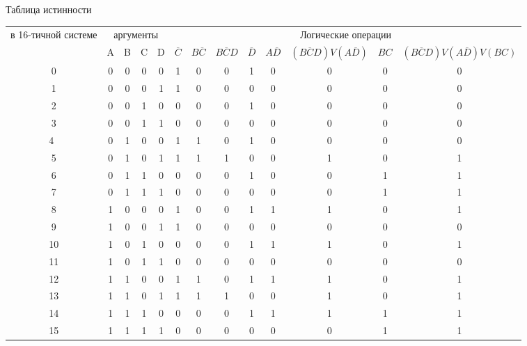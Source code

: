\documentclass{article}
\begin{document}
\begin{landscape}
\centering Таблица истинности

\begin{table}[ht]
\begin{tabular}{ |c|c|c|c|c|c|c|c|c|c|c|c|c| }
\toprule
\multirow{2}{*}{в 16-тичной системе} &\multicolumn{4}{|c|}{аргументы}& 
\multicolumn{8}{|c|}{Логические операции}\\
\cmidrule{2-13}&
\multicolumn{1}{|c|}{A}& \multicolumn{1}{|c|}{B}& \multicolumn{1}{|c|}{C}& \multicolumn{1}{|c|}{D}& \multicolumn{1}{c}{$\overline{C}$}&
\multicolumn{1}{|c|}{$B\overline{C}$}& \multicolumn{1}{c}{$B\overline{C}D$}& \multicolumn{1}{|c|}{$\overline{D}$}&
\multicolumn{1}{|c|}{$A\overline{D}$}& \multicolumn{1}{|c|}{$(B\overline{C}D)V(A\overline{D})$}& \multicolumn{1}{|c|}{$BC$}& \multicolumn{1}{|c|}{$(B\overline{C}D)V(A\overline{D})V(BC)$} \\
\midrule 
0 & 0 & 0 & 0 & 0 & 1 & 0 & 0 & 1 & 0 & 0 & 0 & 0 \\
1 & 0 & 0 & 0 & 1 & 1 & 0 & 0 & 0 & 0 & 0 & 0 & 0 \\
2 & 0 & 0 & 1 & 0 & 0 & 0 & 0 & 1 & 0 & 0 & 0 & 0 \\
3 & 0 & 0 & 1 & 1 & 0 & 0 & 0 & 0 & 0 & 0 & 0 & 0 \\ 
4 & 0 & 1 & 0 & 0 & 1 & 1 & 0 & 1 & 0 & 0 & 0 & 0 \\
5 & 0 & 1 & 0 & 1 & 1 & 1 & 1 & 0 & 0 & 1 & 0 & 1 \\
6 & 0 & 1 & 1 & 0 & 0 & 0 & 0 & 1 & 0 & 0 & 1 & 1 \\
7 & 0 & 1 & 1 & 1 & 0 & 0 & 0 & 0 & 0 & 0 & 1 & 1 \\
8 & 1 & 0 & 0 & 0 & 1 & 0 & 0 & 1 & 1 & 1 & 0 & 1 \\
9 & 1 & 0 & 0 & 1 & 1 & 0 & 0 & 0 & 0 & 0 & 0 & 0 \\
10 & 1 & 0 & 1 & 0 & 0 & 0 & 0 & 1 & 1 & 1 & 0 & 1 \\
11 & 1 & 0 & 1 & 1 & 0 & 0 & 0 & 0 & 0 & 0 & 0 & 0 \\
12 & 1 & 1 & 0 & 0 & 1 & 1 & 0 & 1 & 1 & 1 & 0 & 1 \\
13 & 1 & 1 & 0 & 1 & 1 & 1 & 1 & 0 & 0 & 1 & 0 & 1 \\
14 & 1 & 1 & 1 & 0 & 0 & 0 & 0 & 1 & 1 & 1 & 1 & 1 \\
15 & 1 & 1 & 1 & 1 & 0 & 0 & 0 & 0 & 0 & 0 & 1 & 1 \\
\bottomrule
\end{tabular}
\end{table}
\end{landscape}
\end{document}
